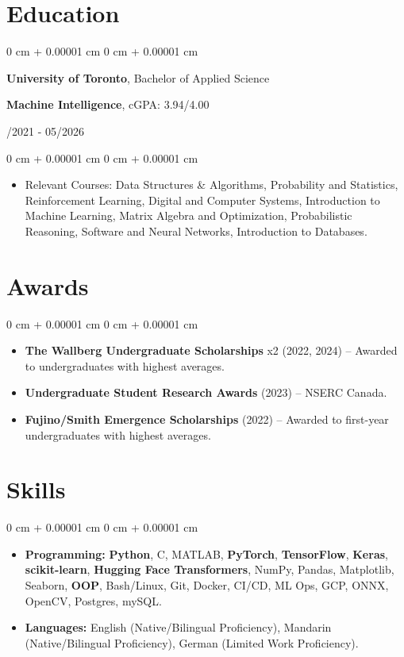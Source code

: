 \documentclass[10pt, letterpaper]{article}
\newenvironment{highlights}{
    \begin{itemize}[
        topsep=0.10 cm,
        parsep=0.10 cm,
        partopsep=0pt,
        itemsep=0pt,
        leftmargin=0 cm + 10pt
    ]
}{
    \end{itemize}
}
\newenvironment{onecolentry}{
    \begin{adjustwidth}{
        0 cm + 0.00001 cm
    }{
        0 cm + 0.00001 cm
    }
}{
    \end{adjustwidth}
}
\newenvironment{twocolentry}[2][]{
    \onecolentry
    \def\secondColumn{#2}
    \setcolumnwidth{\fill, 4.5 cm}
    \begin{paracol}{2}
}{
    \switchcolumn \raggedleft \secondColumn
    \end{paracol}
    \endonecolentry
}
\begin{document}
\section{Education}
\vspace{0.08 cm}
\begin{twocolentry}{09/2021 - 05/2026}
    {\textbf{University of Toronto}}, Bachelor of Applied Science  
    \item \textbf{Machine Intelligence}, cGPA: {3.94}/4.00
\end{twocolentry}
\vspace{0.10 cm}
\begin{onecolentry}
    \begin{highlights}
        \item Relevant Courses: Data Structures \& Algorithms, Probability and Statistics, Reinforcement Learning, Digital and Computer Systems, Introduction to Machine Learning, Matrix Algebra and Optimization, Probabilistic Reasoning, Software and Neural Networks, Introduction to Databases.
    \end{highlights}
\end{onecolentry}

\section{Awards}
\begin{onecolentry}
    \begin{highlights}
        \item \textbf{The Wallberg Undergraduate Scholarships} x2 (2022, 2024) -- Awarded to undergraduates with highest averages.
        \item \textbf{Undergraduate Student Research Awards} (2023) -- NSERC Canada.
        \item \textbf{Fujino/Smith Emergence Scholarships} (2022) -- Awarded to first-year undergraduates with highest averages.
    \end{highlights}
\end{onecolentry}

\section{Skills}
\begin{onecolentry}
    \begin{highlights}
        \item \textbf{Programming:} \textbf{Python}, C, MATLAB, \textbf{PyTorch}, \textbf{TensorFlow}, \textbf{Keras}, \textbf{scikit-learn}, \textbf{Hugging Face Transformers}, NumPy, Pandas, Matplotlib, Seaborn, \textbf{OOP}, Bash/Linux, Git, Docker, CI/CD, ML Ops, GCP, ONNX, OpenCV, Postgres, mySQL.

        \item \textbf{Languages:} English (Native/Bilingual Proficiency), Mandarin (Native/Bilingual Proficiency), German (Limited Work Proficiency).
    \end{highlights}
\end{onecolentry}
\end{document}
